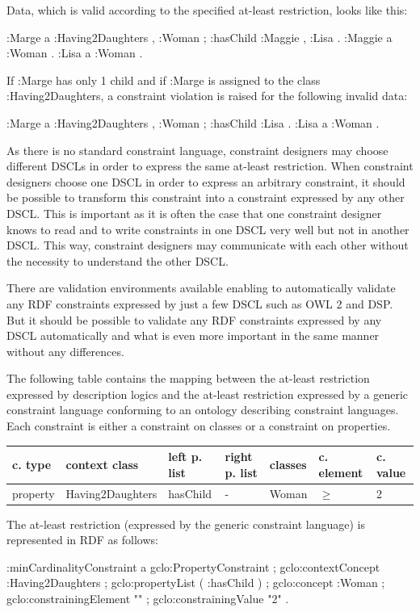 \documentclass{llncs}
\newenvironment{gcotable}{
  \scriptsize
  \sffamily
  \vspace{0.3cm}
	\begin{center}
  \begin{tabular}{l|l|l|l|l|l|l}
  \hline
  \textbf{c. type} & \textbf{context class} & \textbf{left p. list} & \textbf{right p. list} & \textbf{classes} & \textbf{c. element} & \textbf{c. value} \\
  \hline

}{
  \hline
  \end{tabular}
	\end{center}
}
\begin{document}
Data, which is valid according to the specified at-least restriction, looks like this:

\begin{ex}
:Marge
    a :Having2Daughters , :Woman ;
    :hasChild :Maggie , :Lisa .
:Maggie
    a :Woman .
:Lisa
    a :Woman .
\end{ex}

If :Marge has only 1 child and if :Marge is assigned to the class :Having2Daughters, a constraint violation is raised for the following invalid data:

\begin{ex}
:Marge
    a :Having2Daughters , :Woman ;
    :hasChild :Lisa .
:Lisa
    a :Woman .
\end{ex}

As there is no standard constraint language, constraint designers may choose different DSCLs in order to express the same at-least restriction. 
When constraint designers choose one DSCL in order to express an arbitrary constraint, it should be possible to transform this constraint into a constraint expressed by any other DSCL. 
This is important as it is often the case that one constraint designer knows to read and to write constraints in one DSCL very well but not in another DSCL. 
This way, constraint designers may communicate with each other without the necessity to understand the other DSCL.

There are validation environments available enabling to automatically validate any RDF constraints expressed by just a few DSCL such as OWL 2 and DSP.
But it should be possible to validate any RDF constraints expressed by any DSCL automatically and what is even more important in the same manner without any differences.  

The following table contains the mapping between the at-least restriction expressed by description logics and the at-least restriction expressed by a generic constraint language conforming to an ontology describing constraint languages.
Each constraint is either a constraint on classes or a constraint on properties.

\begin{gcotable}
property & Having2Daughters & hasChild & - & Woman & $\geq$ & 2 \\
\end{gcotable}


The at-least restriction (expressed by the generic constraint language) is represented in RDF as follows:

\begin{ex}
:minCardinalityConstraint
    a gclo:PropertyConstraint ;
    gclo:contextConcept :Having2Daughters ;
    gclo:propertyList ( :hasChild ) ;
    gclo:concept :Woman ;
    gclo:constrainingElement "\geq" ;
    gclo:constrainingValue "2" .
\end{ex}
\end{document}
